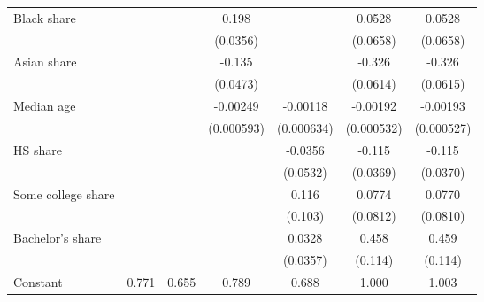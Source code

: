 {\begin{tabular}{l*{6}{c}}
Black share         &                     &                     &       0.198\sym{***}&                     &      0.0528         &      0.0528         \\
                    &                     &                     &    (0.0356)         &                     &    (0.0658)         &    (0.0658)         \\
\addlinespace
Asian share         &                     &                     &      -0.135\sym{***}&                     &      -0.326\sym{***}&      -0.326\sym{***}\\
                    &                     &                     &    (0.0473)         &                     &    (0.0614)         &    (0.0615)         \\
\addlinespace
Median age          &                     &                     &    -0.00249\sym{***}&    -0.00118\sym{*}  &    -0.00192\sym{***}&    -0.00193\sym{***}\\
                    &                     &                     &  (0.000593)         &  (0.000634)         &  (0.000532)         &  (0.000527)         \\
\addlinespace
HS share            &                     &                     &                     &     -0.0356         &      -0.115\sym{***}&      -0.115\sym{***}\\
                    &                     &                     &                     &    (0.0532)         &    (0.0369)         &    (0.0370)         \\
\addlinespace
Some college share  &                     &                     &                     &       0.116         &      0.0774         &      0.0770         \\
                    &                     &                     &                     &     (0.103)         &    (0.0812)         &    (0.0810)         \\
\addlinespace
Bachelor's share    &                     &                     &                     &      0.0328         &       0.458\sym{***}&       0.459\sym{***}\\
                    &                     &                     &                     &    (0.0357)         &     (0.114)         &     (0.114)         \\
\addlinespace
Constant            &       0.771\sym{***}&       0.655\sym{***}&       0.789\sym{***}&       0.688\sym{***}&       1.000\sym{***}&       1.003\sym{***}\\

\end{tabular}}
